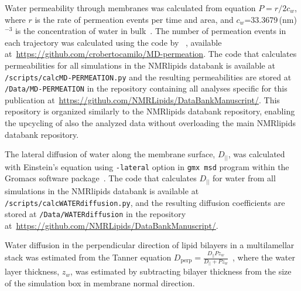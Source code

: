 \documentclass[fleqn,10pt]{wlscirep}
\begin{document}
Water permeability through membranes was calculated from equation $P=r/2c_w$, where $r$ is the rate of permeation events per time and area, and $c_w$=33.3679\,(nm)$^{-3}$ is the concentration of water in bulk~\cite{venable19}. The number of permeation events in each trajectory was calculated using the code by \citeauthor{camilo2022}~\cite{camilo2022}, available at~\url{https://github.com/crobertocamilo/MD-permeation}. 
The code that calculates permeabilities for all simulations in the NMRlipids databank is available at \texttt{/scripts/calcMD-PERMEATION.py} and the resulting permeabilities are stored at \texttt{/Data/MD-PERMEATION} in the repository containing all analyses specific for this publication at~\url{https://github.com/NMRLipids/DataBankManuscript/}. 
This repository is organized similarly to the NMRlipids databank repository, enabling the upcycling of also the analyzed data without overloading the main NMRlipids databank repository. 

The lateral diffusion of water along the membrane surface, $D_{||}$, was calculated with Einstein's equation using \texttt{-lateral} option in \texttt{gmx msd} program within the Gromacs software package~\cite{gromacsMANUAL}. The code that calculates $D_{||}$ for water from all simulations in the NMRlipids databank is available at \texttt{/scripts/calcWATERdiffusion.py}, and the resulting diffusion coefficients are stored at \texttt{/Data/WATERdiffusion} in the repository at~\url{https://github.com/NMRLipids/DataBankManuscript/}.

Water diffusion in the perpendicular direction of lipid bilayers in a multilamellar stack was estimated from the Tanner equation $D_\mathrm{perp} = \frac{D_{||} P z_w}{D_{||} + P z_w}$~\cite{tanner78,wasterby02}, where the water layer thickness, $z_w$, was estimated by subtracting bilayer thickness from the size of the simulation box in membrane normal direction.
\end{document}
